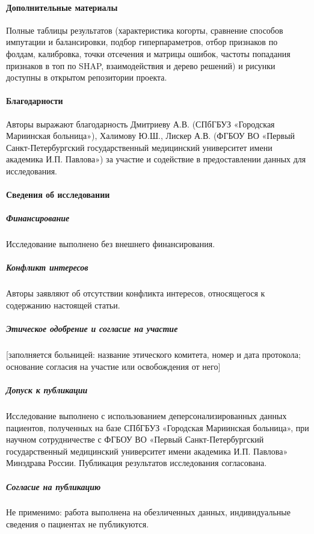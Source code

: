 \documentclass{crm-article}
\begin{document}
\paragraph{Дополнительные материалы}

Полные таблицы результатов (характеристика когорты, сравнение способов импутации и балансировки, подбор гиперпараметров, отбор признаков по фолдам, калибровка, точки отсечения и матрицы ошибок, частоты попадания признаков в топ по SHAP, взаимодействия и дерево решений) и рисунки доступны в открытом репозитории проекта.

\paragraph{Благодарности}

Авторы выражают благодарность Дмитриеву А.В. (СПбГБУЗ «Городская Мариинская больница»), Халимову Ю.Ш., Лискер А.В. (ФГБОУ ВО «Первый Санкт-Петербургский государственный медицинский университет имени академика И.П. Павлова») за участие и содействие в предоставлении данных для исследования.

\paragraph{Сведения об исследовании}

\subparagraph*{Финансирование}

Исследование выполнено без внешнего финансирования.

\subparagraph*{Конфликт интересов}

Авторы заявляют об отсутствии конфликта интересов, относящегося к содержанию настоящей статьи.

\subparagraph*{Этическое одобрение и согласие на участие}

[заполняется больницей: название этического комитета, номер и дата протокола; основание согласия на участие или освобождения от него]

\subparagraph*{Допуск к публикации}

Исследование выполнено с использованием деперсонализированных данных пациентов, полученных на базе СПбГБУЗ «Городская Мариинская больница», при научном сотрудничестве с ФГБОУ ВО «Первый Санкт-Петербургский государственный медицинский университет имени академика И.П. Павлова» Минздрава России. Публикация результатов исследования согласована.

\subparagraph*{Согласие на публикацию}

Не применимо: работа выполнена на обезличенных данных, индивидуальные сведения о пациентах не публикуются.
\end{document}
